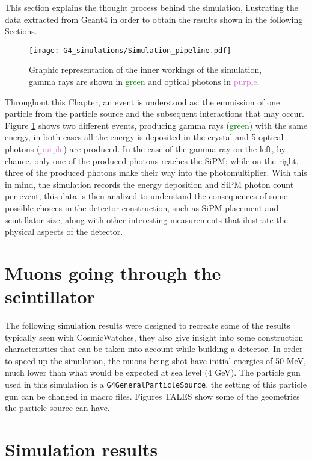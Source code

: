 This section explains the thought process behind the simulation, ilustrating the data extracted from Geant4 in order to obtain the results shown in the following Sections.

\begin{figure}[H]
  \centering
    \texttt{[image: G4\_simulations/Simulation\_pipeline.pdf]}
  \caption{\label{fig:sim_pipeline}Graphic representation of the inner workings of the simulation, gamma rays are shown in \textcolor{green}{green} and optical photons in \textcolor{Orchid}{purple}.}
\end{figure}

Throughout this Chapter, an event is understood as: the emmission of one particle from the particle source and the subsequent interactions that may occur. Figure \ref{fig:sim_pipeline} shows two different events, producing gamma rays (\textcolor{green}{green}) with the same energy, in both cases all the energy is deposited in the crystal and 5 optical photons (\textcolor{Orchid}{purple}) are produced. In the case of the gamma ray on the left, by chance, only one of the produced photons reaches the SiPM; while on the right, three of the produced photons make their way into the photomultiplier. With this in mind, the simulation records the energy deposition and SiPM photon count per event, this data is then analized to understand the consequences of some possible choices in the detector construction, such as SiPM placement and scintillator size, along with other interesting measurements that ilustrate the physical aspects of the detector.

\section{Muons going through the scintillator}

The following simulation results were designed to recreate some of the results typically seen with CosmicWatches, they also give insight into some construction characteristics that can be taken into account while building a detector. In order to speed up the simulation, the muons being shot have initial energies of 50 \unit{\mega\eV}, much lower than what would be expected at sea level (4 \unit{\giga\eV}). The particle gun used in this simulation is a \texttt{G4GeneralParticleSource}, the setting of this particle gun can be changed in macro files. Figures TALES show some of the geometries the particle source can have.

\section{Simulation results}

